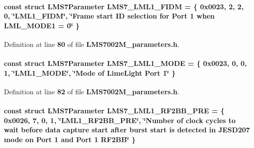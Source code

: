 \paragraph[{L\+M\+S7\+\_\+\+L\+M\+L1\+\_\+\+F\+I\+DM}]{\setlength{\rightskip}{0pt plus 5cm}const struct {\bf L\+M\+S7\+Parameter} L\+M\+S7\+\_\+\+L\+M\+L1\+\_\+\+F\+I\+DM = \{ 0x0023, 2, 2, 0, \char`\"{}\+L\+M\+L1\+\_\+\+F\+I\+D\+M\char`\"{}, \char`\"{}\+Frame start I\+D selection for Port 1 when L\+M\+L\+\_\+\+M\+O\+D\+E1 = 0\char`\"{} \}\hspace{0.3cm}{\ttfamily [static]}}\label{LMS7002M__parameters_8h_ae7d9e3cb88a94895fc300dbd30230bca}


Definition at line {\bf 80} of file {\bf L\+M\+S7002\+M\+\_\+parameters.\+h}.

\paragraph[{L\+M\+S7\+\_\+\+L\+M\+L1\+\_\+\+M\+O\+DE}]{\setlength{\rightskip}{0pt plus 5cm}const struct {\bf L\+M\+S7\+Parameter} L\+M\+S7\+\_\+\+L\+M\+L1\+\_\+\+M\+O\+DE = \{ 0x0023, 0, 0, 1, \char`\"{}\+L\+M\+L1\+\_\+\+M\+O\+D\+E\char`\"{}, \char`\"{}\+Mode of Lime\+Light Port 1\char`\"{} \}\hspace{0.3cm}{\ttfamily [static]}}\label{LMS7002M__parameters_8h_a287d90542cefac8fb640b5e3745e8be2}


Definition at line {\bf 82} of file {\bf L\+M\+S7002\+M\+\_\+parameters.\+h}.

\paragraph[{L\+M\+S7\+\_\+\+L\+M\+L1\+\_\+\+R\+F2\+B\+B\+\_\+\+P\+RE}]{\setlength{\rightskip}{0pt plus 5cm}const struct {\bf L\+M\+S7\+Parameter} L\+M\+S7\+\_\+\+L\+M\+L1\+\_\+\+R\+F2\+B\+B\+\_\+\+P\+RE = \{ 0x0026, 7, 0, 1, \char`\"{}\+L\+M\+L1\+\_\+\+R\+F2\+B\+B\+\_\+\+P\+R\+E\char`\"{}, \char`\"{}\+Number of clock cycles to wait before data capture start after burst start is detected in J\+E\+S\+D207 mode on Port 1 and Port 1 R\+F2\+B\+B\char`\"{} \}\hspace{0.3cm}{\ttfamily [static]}}\label{LMS7002M__parameters_8h_ad072e2fa66b7a101621e5d3e0eb4be29}


